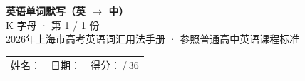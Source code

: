 \documentclass[10pt,a4paper]{article}
\begin{document}
\pagestyle{plain}

\begin{center}
{\LARGE\bfseries 英语单词默写（英 $\to$ 中）}\\[0.22em]
{\large K 字母 · 第 1 / 1 份}\\[0.18em]
{\small 2026年上海市高考英语词汇用法手册 · 参照普通高中英语课程标准}
\end{center}

\vspace{0.25em}
\noindent\begin{tabular}{@{}p{}@{}p{}@{}p{}@{}}
姓名：\underline{\hspace{2.0cm}} & 日期：\underline{\hspace{2.0cm}} & 得分：\underline{\hspace{1.3cm}}\,/\,36 \\
\end{tabular}

\vspace{0.3em}

\vspace{0.08em}
\end{document}
